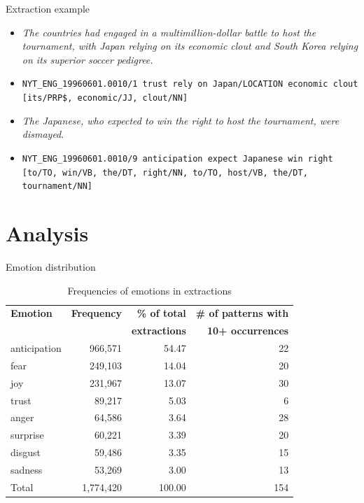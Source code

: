 \documentclass[11pt]{beamer}
\begin{document}
\begin{frame}{Extraction example}
	\begin{itemize}
	\item \textit{The countries had engaged in a multimillion-dollar battle to host the tournament, with Japan relying on its economic clout and South Korea relying on its superior soccer pedigree.}
	\item \texttt{NYT\_ENG\_19960601.0010/1	trust	rely on	Japan/LOCATION	economic clout					[its/PRP\$, economic/JJ, clout/NN]}
	\item \textit{The Japanese, who expected to win the right to host the tournament, were dismayed}.	
		\item \texttt{NYT\_ENG\_19960601.0010/9	anticipation	expect	Japanese				win	right		[to/TO, win/VB, the/DT, right/NN, to/TO, host/VB, the/DT, tournament/NN]}
	\end{itemize}
\end{frame}

\section{Analysis}

\begin{frame}{Emotion distribution}
		
\begin{table}[h]
\centering
\begin{tabular}{l|r|r|r}
{\bf Emotion} & {\bf Frequency} & {\bf\% of total} & {\bf\# of patterns with}\\ 
              &                 &   {\bf extractions}                           & {\bf 10+ occurrences}\\\hline
anticipation  & 966,571          & 54.47                       & 22 \\
fear          & 249,103          & 14.04                       & 20 \\
joy           & 231,967          & 13.07                       & 30 \\
trust         & 89,217           & 5.03                        &  6 \\
anger         & 64,586           & 3.64                        & 28 \\
surprise      & 60,221           & 3.39                        & 20 \\
disgust       & 59,486           & 3.35                        & 15 \\
sadness       & 53,269           & 3.00                        & 13\\\hline
Total         & 1,774,420         & 100.00                     & 154                
\end{tabular}
\caption{Frequencies of emotions in extractions}
\label{tab:extraction-emotion-freq}
\end{table}
\end{frame}
\end{document}
